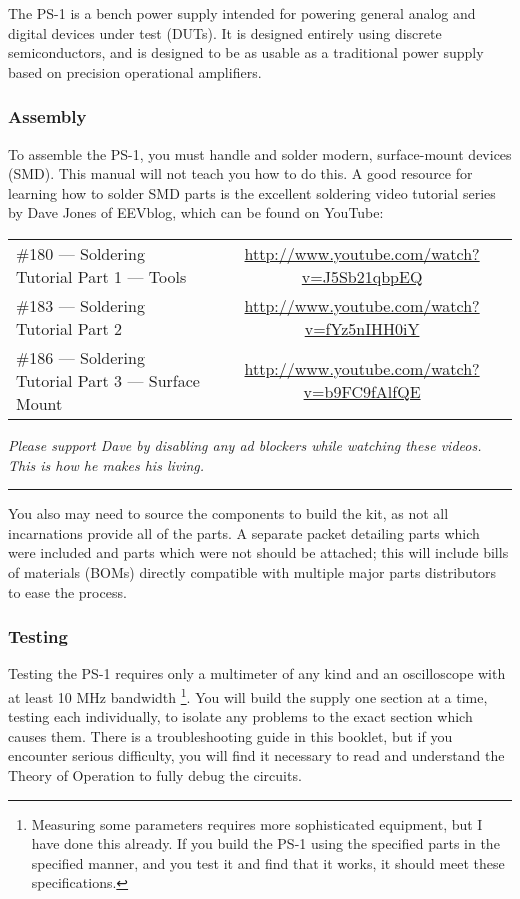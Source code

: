 The PS-1 is a bench power supply intended for powering general analog and
digital devices under test (DUTs). It is designed entirely using
discrete semiconductors, and is designed to be as usable as a traditional power
supply based on precision operational amplifiers.

\subsubsection{Assembly}
To assemble the PS-1, you must handle and solder modern, surface-mount
devices (SMD). This manual will not teach you how to do this. A good
resource for learning how to solder SMD parts is the excellent soldering
video tutorial series by Dave Jones of EEVblog, which can be found on
YouTube:

\begin{center}
\begin{tabular}{lc}
\#180 --- Soldering Tutorial Part 1 --- Tools &
    \url{http://www.youtube.com/watch?v=J5Sb21qbpEQ} \\
\#183 --- Soldering Tutorial Part 2 &
    \url{http://www.youtube.com/watch?v=fYz5nIHH0iY} \\
\#186 --- Soldering Tutorial Part 3 --- Surface Mount &
    \url{http://www.youtube.com/watch?v=b9FC9fAlfQE} \\
\end{tabular}
{\small\it Please support Dave by disabling any ad blockers while watching
    these videos. This is how he makes his living.}
\hrule
\end{center}

You also may need to source the components to build the kit, as not all
incarnations provide all of the parts. A separate packet detailing parts which
were included and parts which were not should be attached; this will include
bills of materials (BOMs) directly compatible with multiple major parts
distributors to ease the process.

\subsubsection{Testing}
Testing the PS-1 requires only a multimeter of any kind and an oscilloscope
with at least 10 MHz bandwidth%
\footnote{Measuring some parameters requires more sophisticated equipment, but
I have done this already. If you build the PS-1 using the specified parts in
the specified manner, and you test it and find that it works, it should meet
these specifications.}.
You will build the supply one section at a
time, testing each individually, to isolate any problems to the exact section
which causes them. There is a troubleshooting guide in this booklet, but if you
encounter serious difficulty, you will find it necessary to read and understand
the Theory of Operation to fully debug the circuits.


